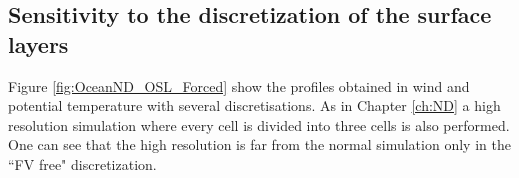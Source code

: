 \subsection{Sensitivity to the discretization
	of the surface layers}
\label{sec:ND_Ocean_bulkRadiativeFluxes}
Figure \ref{fig:OceanND_OSL_Forced}
show the profiles obtained in wind and
potential temperature with several discretisations.
As in Chapter \ref{ch:ND} a high resolution simulation
where every cell is divided into three cells
is also performed.
One can see that the high resolution
is far from the normal simulation only in the ``FV free"
discretization.

